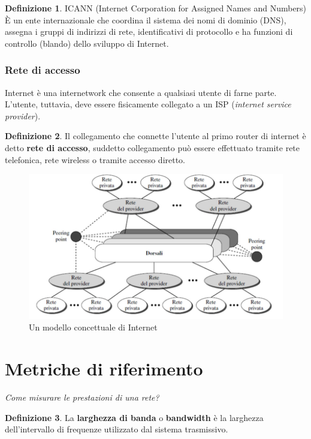 \documentclass[11pt,a4paper]{article}
\theoremstyle{definition}
\newtheorem{definition}{Definizione}[section]
\begin{document}
\theoremstyle{definition}
\begin{definition}
	ICANN (Internet Corporation for Assigned Names and Numbers) È un ente internazionale che coordina il sistema dei nomi di dominio (DNS), assegna i gruppi di indirizzi di rete, identificativi di protocollo e ha funzioni di controllo (blando) dello sviluppo di Internet.
\end{definition}

\subsubsection{Rete di accesso}
Internet è una internetwork che consente a qualsiasi utente
di farne parte. L’utente, tuttavia, deve essere fisicamente collegato a un
ISP (\textit{internet service provider}).
\theoremstyle{definition}
\begin{definition}
	Il collegamento che connette l'utente al primo router di internet è detto \textbf{rete di accesso}, suddetto collegamento può essere effettuato tramite rete telefonica, rete wireless o tramite accesso diretto.
\end{definition}

\newpage

\begin{figure}[!h]
	\includegraphics[scale=0.5]{Immagini/Internet_Concept.png}
	\centering
	\caption{Un modello concettuale di Internet}
\end{figure}

\section{Metriche di riferimento}
\textit{Come misurare le prestazioni di una rete?}\newline

\theoremstyle{definition}
\begin{definition}
	La \textbf{larghezza di banda} o \textbf{bandwidth} è la larghezza dell'intervallo di frequenze utilizzato dal sistema trasmissivo.
\end{definition}
\end{document}
